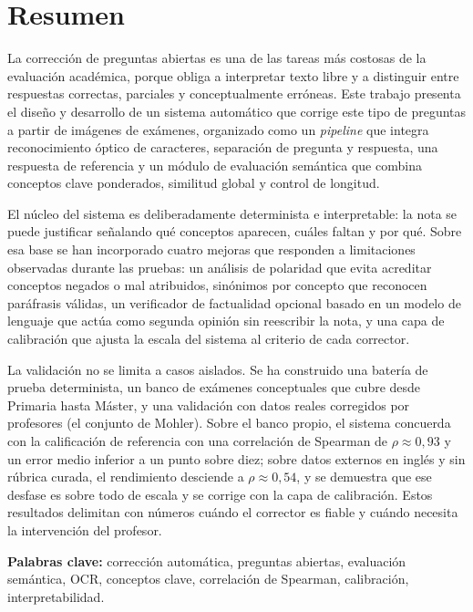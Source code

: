 \chapter*{Resumen}

La corrección de preguntas abiertas es una de las tareas más costosas de la evaluación académica, porque obliga a interpretar texto libre y a distinguir entre respuestas correctas, parciales y conceptualmente erróneas. Este trabajo presenta el diseño y desarrollo de un sistema automático que corrige este tipo de preguntas a partir de imágenes de exámenes, organizado como un \emph{pipeline} que integra reconocimiento óptico de caracteres, separación de pregunta y respuesta, una respuesta de referencia y un módulo de evaluación semántica que combina conceptos clave ponderados, similitud global y control de longitud.

El núcleo del sistema es deliberadamente determinista e interpretable: la nota se puede justificar señalando qué conceptos aparecen, cuáles faltan y por qué. Sobre esa base se han incorporado cuatro mejoras que responden a limitaciones observadas durante las pruebas: un análisis de polaridad que evita acreditar conceptos negados o mal atribuidos, sinónimos por concepto que reconocen paráfrasis válidas, un verificador de factualidad opcional basado en un modelo de lenguaje que actúa como segunda opinión sin reescribir la nota, y una capa de calibración que ajusta la escala del sistema al criterio de cada corrector.

La validación no se limita a casos aislados. Se ha construido una batería de prueba determinista, un banco de exámenes conceptuales que cubre desde Primaria hasta Máster, y una validación con datos reales corregidos por profesores (el conjunto de Mohler). Sobre el banco propio, el sistema concuerda con la calificación de referencia con una correlación de Spearman de $\rho \approx 0{,}93$ y un error medio inferior a un punto sobre diez; sobre datos externos en inglés y sin rúbrica curada, el rendimiento desciende a $\rho \approx 0{,}54$, y se demuestra que ese desfase es sobre todo de escala y se corrige con la capa de calibración. Estos resultados delimitan con números cuándo el corrector es fiable y cuándo necesita la intervención del profesor.

\vspace{0.8cm}
\noindent\textbf{Palabras clave:} corrección automática, preguntas abiertas, evaluación semántica, OCR, conceptos clave, correlación de Spearman, calibración, interpretabilidad.


